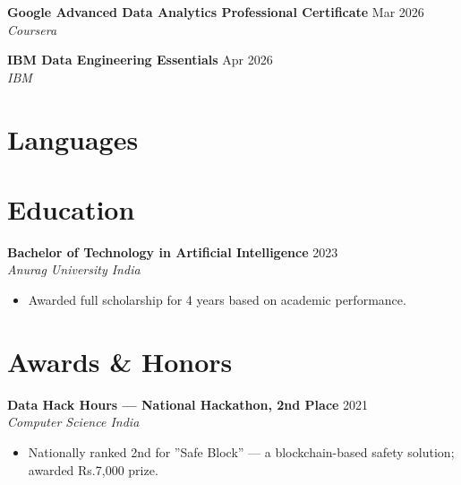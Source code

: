 \documentclass[10pt,letterpaper]{article}
\newcommand{\entry}[3]{%
  \vspace{3pt}\textbf{#1} \hfill #3 \\
  \textit{\small #2}\vspace{1pt}}
\begin{document}
\textbf{Google Advanced Data Analytics Professional Certificate} \hfill Mar 2026 \\
\textit{Coursera}

\textbf{IBM Data Engineering Essentials} \hfill Apr 2026 \\
\textit{IBM}

\section{Languages}


\section{Education}

\entry{Bachelor of Technology in Artificial Intelligence}{Anurag University \textbullet{} India}{2023}
\begin{itemize}
  \item Awarded full scholarship for 4 years based on academic performance.
\end{itemize}

\section{Awards \& Honors}

\textbf{Data Hack Hours --- National Hackathon, 2nd Place} \hfill 2021 \\
\textit{Computer Science India}
\begin{itemize}
  \item Nationally ranked 2nd for ''Safe Block'' --- a blockchain-based safety solution; awarded Rs.7,000 prize.
\end{itemize}
\end{document}
